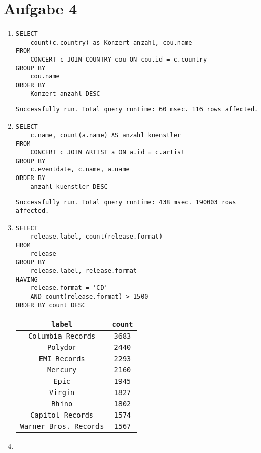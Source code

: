 \documentclass{article}
\begin{document}
\section*{Aufgabe 4}
    \begin{enumerate}
        \item
            \begin{verbatim}
SELECT
    count(c.country) as Konzert_anzahl, cou.name
FROM
    CONCERT c JOIN COUNTRY cou ON cou.id = c.country
GROUP BY
    cou.name
ORDER BY
    Konzert_anzahl DESC
            \end{verbatim}
        \texttt{Successfully run. Total query runtime: 60 msec. 116 rows affected.}
        \item
            \begin{verbatim}
SELECT
    c.name, count(a.name) AS anzahl_kuenstler
FROM
    CONCERT c JOIN ARTIST a ON a.id = c.artist
GROUP BY
    c.eventdate, c.name, a.name
ORDER BY
    anzahl_kuenstler DESC
            \end{verbatim}

            \texttt{Successfully run. Total query runtime: 438 msec.  190003 rows affected.}
        \item
            \begin{verbatim}
SELECT
    release.label, count(release.format)
FROM
    release
GROUP BY
    release.label, release.format
HAVING
    release.format = 'CD'
    AND count(release.format) > 1500
ORDER BY count DESC
            \end{verbatim}

            \begin{tabular}{|c|c|}
                \texttt{label} & \texttt{count} \\
                \toprule
                \texttt{Columbia Records} &  \texttt{3683} \\
                \texttt{Polydor} &   \texttt{2440} \\
                \texttt{EMI Records} &   \texttt{2293} \\
                \texttt{Mercury} &   \texttt{2160} \\
                \texttt{Epic} &  \texttt{1945} \\
                \texttt{Virgin} &    \texttt{1827} \\
                \texttt{Rhino} & \texttt{1802} \\
                \texttt{Capitol Records} &   \texttt{1574} \\
                \texttt{Warner Bros. Records} &  \texttt{1567} \\
            \end{tabular}
        \item
            \begin{verbatim}
            \end{verbatim}
    \end{enumerate}
\end{document}
